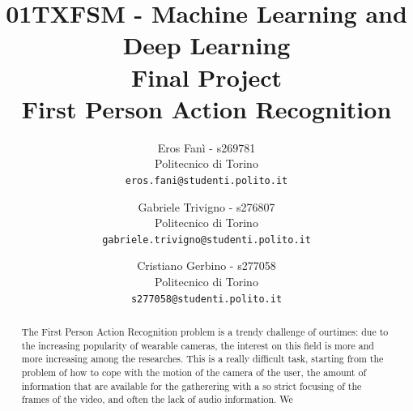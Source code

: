 \documentclass[10pt,twocolumn,hidelinks,letterpaper]{article}
\begin{document}
\title{01TXFSM - Machine Learning and Deep Learning \\
\vspace{0.3in}
Final Project \\
First Person Action Recognition}

\author{
  Eros Fanì - s269781\\
  Politecnico di Torino\\
  {\tt\small eros.fani@studenti.polito.it}
  \and
  Gabriele Trivigno - s276807\\
  Politecnico di Torino\\
  {\tt\small gabriele.trivigno@studenti.polito.it}
  \and
  Cristiano Gerbino - s277058\\
  Politecnico di Torino\\
  {\tt\small s277058@studenti.polito.it}
}

\maketitle


\newcommand{\quotes}[1]{“#1”}
\newcommand{\reff}[1]{Figure \ref{#1}}
\setlength{\parindent}{0pt}
\setlength{\parskip}{1em}

\begin{abstract}

The First Person Action Recognition problem is a trendy challenge of ourtimes: due to the increasing popularity of wearable cameras, the interest on this field is more and more increasing among the researches. This is a really difficult task, starting from the problem of how to cope with the motion of the camera of the user, the amount of information that are available for the gatherering with a so strict focusing of the frames of the video, and often the lack of audio information. We

\end{abstract}
\end{document}
